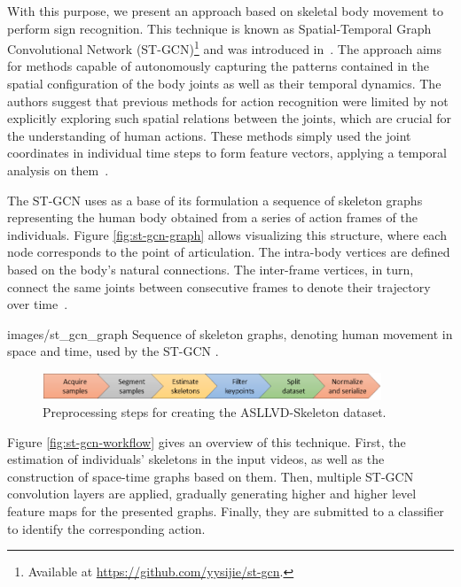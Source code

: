 With this purpose, we present an approach based on skeletal body movement to perform sign recognition. This technique is known as Spatial-Temporal Graph Convolutional Network (ST-GCN)\footnote {Available at \url{https://github.com/yysijie/st-gcn}.} and was introduced in~\cite{st-gcn-2018}. The approach aims for methods capable of autonomously capturing the patterns contained in the spatial configuration of the body joints as well as their temporal dynamics. The authors suggest that previous methods for action recognition were limited by not explicitly exploring such spatial relations between the joints, which are crucial for the understanding of human actions. These methods simply used the joint coordinates in individual time steps to form feature vectors, applying a temporal analysis on them~\cite{st-gcn-2018,wang-2012,fernando-2015}.

The ST-GCN uses as a base of its formulation a sequence of skeleton graphs representing the human body obtained from a series of action frames of the individuals. Figure \ref{fig:st-gcn-graph} allows visualizing this structure, where each node corresponds to the point of articulation. The intra-body vertices are defined based on the body's natural connections. The inter-frame vertices, in turn, connect the same joints between consecutive frames to denote their trajectory over time~\cite{st-gcn-2018}.
    
    {images/st_gcn_graph}
    {Sequence of skeleton graphs, denoting human movement in space and time, used by the ST-GCN \cite[p. 1]{st-gcn-2018}.}

\begin{figure}[ht!]
    \centering
    \includegraphics[width=0.9\textwidth]{images/dataset_preprocessing_en}
    \caption{Preprocessing steps for creating the ASLLVD-Skeleton dataset.}
    \label{fig:preprocessamento}
\end{figure}

Figure \ref{fig:st-gcn-workflow} gives an overview of this technique. First, the estimation of individuals' skeletons in the input videos, as well as the construction of space-time graphs based on them. Then, multiple ST-GCN convolution layers are applied, gradually generating higher and higher level feature maps for the presented graphs. Finally, they are submitted to a classifier to identify the corresponding action.

